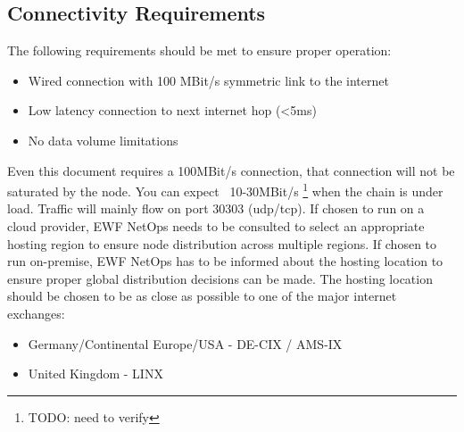 \subsection{Connectivity Requirements}

The following requirements should be met to ensure proper operation:

\begin{itemize}
    \item Wired connection with 100 MBit/s symmetric link to the internet
    \item Low latency connection to next internet hop (<5ms)
    \item No data volume limitations
\end{itemize}

Even this document requires a 100MBit/s connection, that connection will not be saturated by the node. You can expect ~10-30MBit/s \footnote{TODO: need to verify} when the chain is under load. 
Traffic will mainly flow on port 30303 (udp/tcp). If chosen to run on a cloud provider, EWF NetOps needs to be consulted to select an appropriate hosting region to ensure node distribution across multiple regions.
If chosen to run on-premise, EWF NetOps has to be informed about the hosting location to ensure proper global distribution decisions can be made.
The hosting location should be chosen to be as close as possible to one of the major internet exchanges:

\begin{itemize}
    \item Germany/Continental Europe/USA - DE-CIX / AMS-IX
    \item United Kingdom - LINX
\end{itemize}